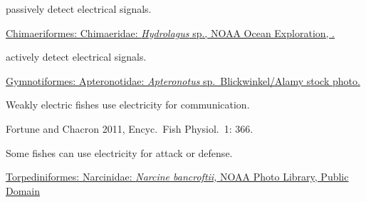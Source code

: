 \label{key}\documentclass[t]{beamer}
\begin{document}
%
{
\begin{frame}[t]{ passively detect electrical signals.}

\vfill

\tinyfill \href{ https://www.flickr.com/photos/27077560@N05/49203331708}{Chimaeriformes: Chimaeridae: \textit{Hydrolagus} sp., NOAA Ocean Exploration, .}

\end{frame}
}
%
{
\begin{frame}[t]{ actively detect electrical signals.}

\vfill

\tinyfill \textcolor{white}{ \href{https://www.science.org/content/article/how-ghost-knifefish-became-fastest-electrical-discharger-animal-kingdom}{Gymnotiformes: Apteronotidae: \textit{Apteronotus} sp. \textcopyright\,Blickwinkel/Alamy stock photo.}}

\end{frame}
}
%
{
\begin{frame}[t]{Weakly electric fishes use electricity for communication.}

\vfill

\tinyfill Fortune and Chacron 2011, Encyc.~Fish Physiol.~1: 366.

\end{frame}
}
%
{
\begin{frame}[t]{Some fishes can use electricity for attack or defense.}

\vfill

\tinyfill \href{https://commons.wikimedia.org/w/index.php?curid=17940959}{Torpediniformes: Narcinidae: \textit{Narcine bancroftii,} NOAA Photo Library, Public Domain}

\end{frame}
}

%
\end{document}
